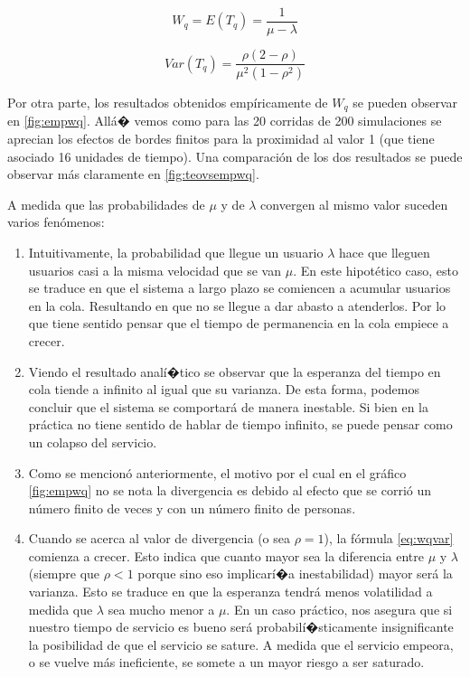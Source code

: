 \documentclass{sig-alternate}
\begin{document}
\begin{equation}
\label{eq:wq}
  W_q = E (T_q)= \frac{1}{\mu-\lambda}
\end{equation}

\begin{equation}
\label{eq:wqvar}
  Var(T_q) = \frac{\rho(2-\rho)}{\mu^2(1-\rho^2)}
\end{equation}

Por otra parte, los resultados obtenidos emp\'iricamente de $W_q$ se pueden observar en \ref{fig:empwq}.
All\'a� vemos como para las 20 corridas de 200 simulaciones se aprecian los efectos de bordes finitos para
la proximidad al valor 1 (que tiene asociado 16 unidades de tiempo).
Una comparaci\'on de los dos resultados se puede observar m\'as claramente en \ref{fig:teovsempwq}.

A medida que las probabilidades de $\mu$ y de $\lambda$ convergen al mismo valor suceden varios fen\'omenos: 
\begin{enumerate}
\item Intuitivamente, la probabilidad que llegue un usuario $\lambda$ hace que lleguen usuarios casi a la misma velocidad que se van $\mu$. En este hipotético caso, esto se traduce en que el sistema a largo plazo se comiencen a acumular usuarios en la cola. Resultando en que no se llegue a dar abasto a atenderlos. Por lo que tiene sentido pensar que el tiempo de permanencia en la cola empiece a crecer.
\item Viendo el resultado anal\'i�tico se observar que la esperanza del tiempo en cola tiende a infinito al igual que su varianza. De esta forma, podemos concluir que el sistema se comportará de manera inestable. Si bien en la práctica no tiene sentido de hablar de tiempo infinito, se puede pensar como un colapso del servicio.
\item Como se mencion\'o anteriormente, el motivo por el cual en el gr\'afico \ref{fig:empwq} no se nota la divergencia es debido al efecto que se corrió un número finito de veces y con un número finito de personas. 
\item Cuando se acerca al valor de divergencia (o sea $\rho=1$), la f\'ormula \ref{eq:wqvar}  comienza a crecer.
Esto indica que cuanto mayor sea la diferencia entre $\mu$ y $\lambda$ (siempre que $\rho < 1$ porque sino eso
implicar\'i�a inestabilidad) mayor ser\'a la varianza.
Esto se traduce en que la esperanza tendr\'a menos volatilidad a medida que $\lambda$ sea mucho menor a $\mu$.
En un caso pr\'actico, nos asegura que si nuestro tiempo de servicio es bueno ser\'a probabil\'i�sticamente
insignificante la posibilidad de que el servicio se sature.
A medida que el servicio empeora, o se vuelve m\'as ineficiente, se somete a un mayor riesgo a ser saturado.


\end{enumerate}
\end{document}
